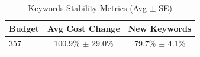 \begin{table}[htbp]
\centering
\caption{Keywords Stability Metrics (Avg $\pm$ SE)}
\begin{tabular}{lcc}
\toprule
Budget & Avg Cost Change & New Keywords \\
\midrule
357 & 100.9\% $\pm$ 29.0\% & 79.7\% $\pm$ 4.1\% \\
\bottomrule
\end{tabular}
\end{table}